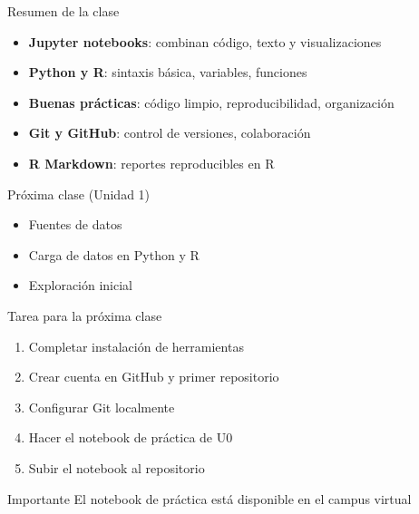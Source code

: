 \documentclass[aspectratio=169]{beamer}
\begin{document}
\begin{frame}{Resumen de la clase}
\begin{itemize}
    \item \textbf{Jupyter notebooks}: combinan código, texto y visualizaciones
    \item \textbf{Python y R}: sintaxis básica, variables, funciones
    \item \textbf{Buenas prácticas}: código limpio, reproducibilidad, organización
    \item \textbf{Git y GitHub}: control de versiones, colaboración
    \item \textbf{R Markdown}: reportes reproducibles en R
\end{itemize}

\vspace{1em}

\begin{block}{Próxima clase (Unidad 1)}
\begin{itemize}
    \item Fuentes de datos
    \item Carga de datos en Python y R
    \item Exploración inicial
\end{itemize}
\end{block}
\end{frame}

\begin{frame}{Tarea para la próxima clase}
\begin{enumerate}
    \item Completar instalación de herramientas
    \item Crear cuenta en GitHub y primer repositorio
    \item Configurar Git localmente
    \item Hacer el notebook de práctica de U0
    \item Subir el notebook al repositorio
\end{enumerate}

\vspace{1em}

\begin{alertblock}{Importante}
El notebook de práctica está disponible en el campus virtual
\end{alertblock}
\end{frame}
\end{document}
